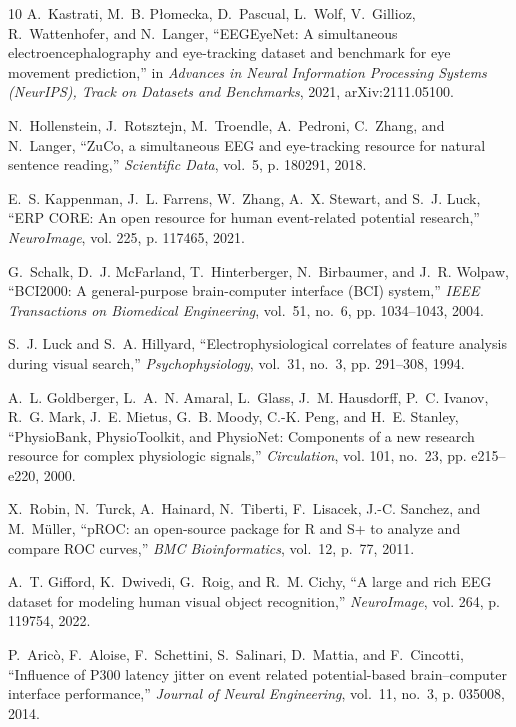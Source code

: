 \documentclass[conference]{IEEEtran}
\begin{document}
\begin{thebibliography}{10}
A.~Kastrati, M.~B. P{\l}omecka, D.~Pascual, L.~Wolf, V.~Gillioz,
  R.~Wattenhofer, and N.~Langer, ``{EEGEyeNet}: A simultaneous
  electroencephalography and eye-tracking dataset and benchmark for eye
  movement prediction,'' in \emph{Advances in Neural Information Processing
  Systems (NeurIPS), Track on Datasets and Benchmarks}, 2021, arXiv:2111.05100.

N.~Hollenstein, J.~Rotsztejn, M.~Troendle, A.~Pedroni, C.~Zhang, and N.~Langer,
  ``{ZuCo}, a simultaneous {EEG} and eye-tracking resource for natural sentence
  reading,'' \emph{Scientific Data}, vol.~5, p. 180291, 2018.

E.~S. Kappenman, J.~L. Farrens, W.~Zhang, A.~X. Stewart, and S.~J. Luck, ``{ERP
  CORE}: An open resource for human event-related potential research,''
  \emph{NeuroImage}, vol. 225, p. 117465, 2021.

G.~Schalk, D.~J. McFarland, T.~Hinterberger, N.~Birbaumer, and J.~R. Wolpaw,
  ``{BCI2000}: A general-purpose brain-computer interface ({BCI}) system,''
  \emph{IEEE Transactions on Biomedical Engineering}, vol.~51, no.~6, pp.
  1034--1043, 2004.

S.~J. Luck and S.~A. Hillyard, ``Electrophysiological correlates of feature
  analysis during visual search,'' \emph{Psychophysiology}, vol.~31, no.~3, pp.
  291--308, 1994.

A.~L. Goldberger, L.~A.~N. Amaral, L.~Glass, J.~M. Hausdorff, P.~C. Ivanov,
  R.~G. Mark, J.~E. Mietus, G.~B. Moody, C.-K. Peng, and H.~E. Stanley,
  ``{PhysioBank}, {PhysioToolkit}, and {PhysioNet}: Components of a new
  research resource for complex physiologic signals,'' \emph{Circulation}, vol.
  101, no.~23, pp. e215--e220, 2000.

X.~Robin, N.~Turck, A.~Hainard, N.~Tiberti, F.~Lisacek, J.-C. Sanchez, and
  M.~M{\"u}ller, ``{pROC}: an open-source package for {R} and {S+} to analyze
  and compare {ROC} curves,'' \emph{BMC Bioinformatics}, vol.~12, p.~77, 2011.

A.~T. Gifford, K.~Dwivedi, G.~Roig, and R.~M. Cichy, ``A large and rich {EEG}
  dataset for modeling human visual object recognition,'' \emph{NeuroImage},
  vol. 264, p. 119754, 2022.

P.~Aric{\`o}, F.~Aloise, F.~Schettini, S.~Salinari, D.~Mattia, and F.~Cincotti,
  ``Influence of {P300} latency jitter on event related potential-based
  brain--computer interface performance,'' \emph{Journal of Neural
  Engineering}, vol.~11, no.~3, p. 035008, 2014.


\end{thebibliography}
\end{document}
